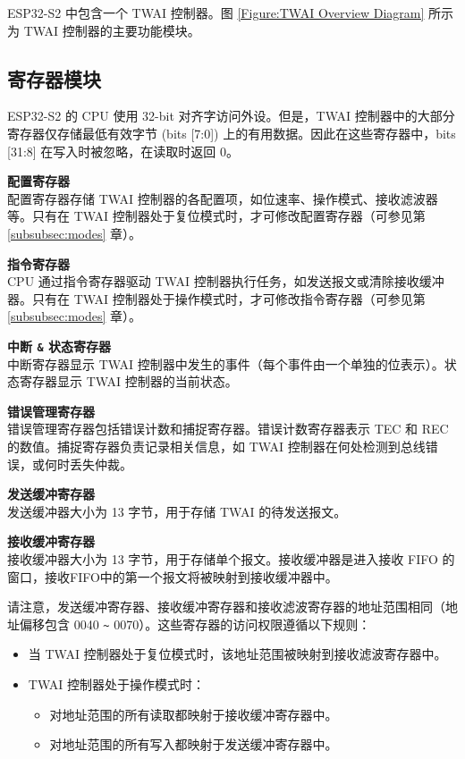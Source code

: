 \documentclass[main\_\_CN.tex]{subfiles}
\begin{document}
ESP32-S2 中包含一个 TWAI 控制器。图 \ref{Figure:TWAI Overview Diagram} 所示为 TWAI 控制器的主要功能模块。

\newpage
\subsection{寄存器模块}
ESP32-S2 的 CPU 使用 32-bit 对齐字访问外设。但是，TWAI 控制器中的大部分寄存器仅存储最低有效字节 (bits [7:0]) 上的有用数据。因此在这些寄存器中，bits [31:8] 在写入时被忽略，在读取时返回 0。

{\bfseries 配置寄存器}\\
配置寄存器存储 TWAI 控制器的各配置项，如位速率、操作模式、接收滤波器等。只有在 TWAI 控制器处于复位模式时，才可修改配置寄存器（可参见第 \ref{subsubsec:modes} 章）。

{\bfseries 指令寄存器}\\
CPU 通过指令寄存器驱动 TWAI 控制器执行任务，如发送报文或清除接收缓冲器。只有在 TWAI 控制器处于操作模式时，才可修改指令寄存器（可参见第 \ref{subsubsec:modes} 章）。

{\bfseries 中断 \verb+&+ 状态寄存器}\\
中断寄存器显示 TWAI 控制器中发生的事件（每个事件由一个单独的位表示）。状态寄存器显示 TWAI 控制器的当前状态。

{\bfseries 错误管理寄存器}\\
错误管理寄存器包括错误计数和捕捉寄存器。错误计数寄存器表示 TEC 和 REC 的数值。捕捉寄存器负责记录相关信息，如 TWAI 控制器在何处检测到总线错误，或何时丢失仲裁。

{\bfseries 发送缓冲寄存器}\\
发送缓冲器大小为 13 字节，用于存储 TWAI 的待发送报文。

{\bfseries 接收缓冲寄存器}\\
接收缓冲器大小为 13 字节，用于存储单个报文。接收缓冲器是进入接收 FIFO 的窗口，接收FIFO中的第一个报文将被映射到接收缓冲器中。

请注意，发送缓冲寄存器、接收缓冲寄存器和接收滤波寄存器的地址范围相同（地址偏移包含 \hexprefix{}0040 \verb+~+ \hexprefix{}0070）。这些寄存器的访问权限遵循以下规则：

\begin{itemize}
    \item 当 TWAI 控制器处于复位模式时，该地址范围被映射到接收滤波寄存器中。
    \item TWAI 控制器处于操作模式时：
    \begin{itemize}
        \item 对地址范围的所有读取都映射于接收缓冲寄存器中。
        \item 对地址范围的所有写入都映射于发送缓冲寄存器中。
    \end{itemize}
\end{itemize}
\end{document}
